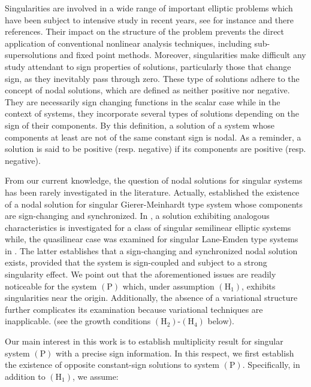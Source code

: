 \documentclass[11pt]{amsart}
\theoremstyle{definition}
\theoremstyle{remark}
\numberwithin{equation}{section}
\begin{document}
Singularities are involved in a wide range of important elliptic problems
which have been subject to intensive study in recent years, see for instance 
\cite{AM, AMT, DM, DM1, DM2, 3, GHM, GST2, KM, MMM, MM3, MM2, MM1, M, M2,
M3, M4, MKT, MV2} and there references. Their impact on the structure of the
problem prevents the direct application of conventional nonlinear analysis
techniques, including sub-supersolutions and fixed point methods. Moreover,
singularities make difficult any study attendant to sign properties of
solutions, particularly those that change sign, as they inevitably pass
through zero. These type of solutions adhere to the concept of nodal
solutions, which are defined as neither positive nor negative. They are
necessarily sign changing functions in the scalar case while in the context
of systems, they incorporate several types of solutions depending on the
sign of their components. By this definition, a solution of a system whose
components at least are not of the same constant sign is nodal. As a
reminder, a solution is said to be positive (resp. negative) if its
components are positive (resp. negative).

From our current knowledge, the question of nodal solutions for singular
systems has been rarely investigated in the literature. Actually, \cite{M4}
established the existence of a nodal solution for singular Gierer-Meinhardt
type system whose components are sign-changing and synchronized. In \cite{M}%
, a solution exhibiting analogous characteristics is investigated for a
class of singular semilinear elliptic systems while, the quasilinear case
was examined for singular Lane-Emden type systems in \cite{M3}. The latter
establishes that a sign-changing and synchronized nodal solution exists,
provided that the system is sign-coupled and subject to a strong singularity
effect. We point out that the aforementioned issues are readily noticeable
for the system $(\mathrm{P})$ which, under assumption $(\mathrm{H}_{1})$,
exhibits singularities near the origin. Additionally, the absence of a
variational structure further complicates its examination because
variational techniques are inapplicable. (see the growth conditions $(%
\mathrm{H}_{2})$-$(\mathrm{H}_{4})$ below).

Our main interest in this work is to establish multiplicity result for
singular system $(\mathrm{P})$ with a precise sign information. In this
respect, we first establish the existence of opposite constant-sign
solutions to system $(\mathrm{P})$. Specifically, in addition to $(\mathrm{H}%
_{1})$, we assume:
\end{document}
